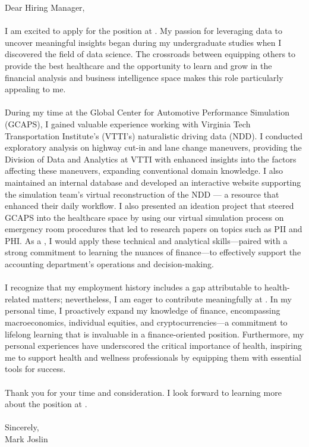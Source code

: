 \documentclass[10pt]{../cv} %
\begin{document}

\cvHeader{\name}{\phone}{\location}{\email}{\github}{\linkedin}
\vspace{\baselineskip}


Dear Hiring Manager,
\\
\\
I am excited to apply for the \position{} position at \company{}. My passion for leveraging data to uncover meaningful insights began during my undergraduate studies when I discovered the field of data science. The crossroads between equipping others to provide the best healthcare and the opportunity to learn and grow in the financial analysis and business intelligence space makes this role particularly appealing to me.
\\
\\
During my time at the Global Center for Automotive Performance Simulation (GCAPS), I gained valuable experience working with Virginia Tech Transportation Institute’s (VTTI’s) naturalistic driving data (NDD). I conducted exploratory analysis on highway cut-in and lane change maneuvers, providing the Division of Data and Analytics at VTTI with enhanced insights into the factors affecting these maneuvers, expanding conventional domain knowledge. I also maintained an internal database and developed an interactive website supporting the simulation team’s virtual reconstruction of the NDD — a resource that enhanced their daily workflow. I also presented an ideation project that steered GCAPS into the healthcare space by using our virtual simulation process on emergency room procedures that led to research papers on topics such as PII and PHI. As a \position{}, I would apply these technical and analytical skills—paired with a strong commitment to learning the nuances of finance—to effectively support the accounting department’s operations and decision-making.
\\
\\
I recognize that my employment history includes a gap attributable to health-related matters; nevertheless, I am eager to contribute meaningfully at \company{}. In my personal time, I proactively expand my knowledge of finance, encompassing macroeconomics, individual equities, and cryptocurrencies—a commitment to lifelong learning that is invaluable in a finance-oriented position. Furthermore, my personal experiences have underscored the critical importance of health, inspiring me to support health and wellness professionals by equipping them with essential tools for success.
\\
\\
Thank you for your time and consideration. I look forward to learning more about the \position{} position at \company{}.
\\
\\
Sincerely,
\\
Mark Joslin
\\
\\
\end{document}

